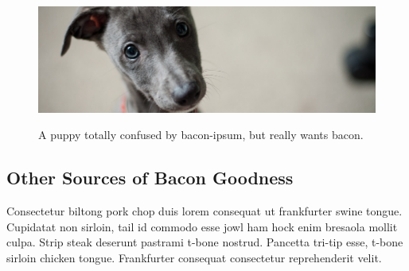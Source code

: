 \documentclass[stu,floatsintext]{apa7}
\begin{document}
\begin{figure}
  \centering
  \caption{A puppy totally confused by bacon-ipsum, but really wants bacon.}
  \includegraphics[width=\textwidth]{dog.jpg}
  \label{fig:my_fig}
\end{figure}

\subsection{Other Sources of Bacon Goodness}
Consectetur biltong pork chop duis lorem consequat ut frankfurter swine tongue. Cupidatat non sirloin, tail id commodo esse jowl ham hock enim bresaola mollit culpa. Strip steak deserunt pastrami t-bone nostrud. Pancetta tri-tip esse, t-bone sirloin chicken tongue. Frankfurter consequat consectetur reprehenderit velit.

\printbibliography
\end{document}
